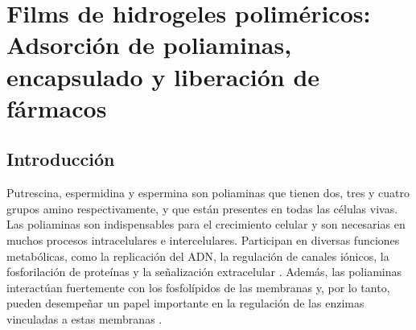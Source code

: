 
\chapter{Films de hidrogeles polim\'ericos: Adsorci\'on de poliaminas, encapsulado y liberaci\'on de f\'armacos }
\label{Chapter-film} %



\section{Introducci\'on}

Putrescina, espermidina y espermina son poliaminas que tienen dos, tres y cuatro grupos amino respectivamente, y que est\'an presentes en todas las c\'elulas vivas.
Las poliaminas son indispensables para el crecimiento celular y son necesarias en muchos procesos intracelulares e intercelulares.
Participan en diversas funciones metab\'olicas, como la replicaci\'on del ADN, la regulaci\'on de canales i\'onicos, la fosforilaci\'on de prote\'inas y la se\~nalizaci\'on extracelular \cite{igarashi2010,Soda2011}.
Adem\'as, las poliaminas interact\'uan fuertemente con los fosfol\'ipidos de las membranas y, por lo tanto, pueden desempe\~nar un papel importante en la regulaci\'on de las enzimas vinculadas a estas membranas \cite{moinard2005}.

